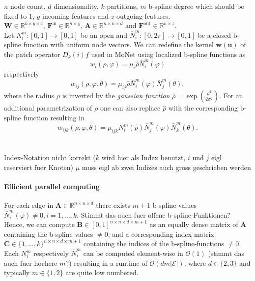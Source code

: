 \documentclass[pdftex,10pt,a4paper]{scrartcl}
\begin{document}
$n$ node count,
$d$ dimensionality,
$k$ partitions,
$m$ b-spline degree which should be fixed to $1$,
$y$ incoming features and
$z$ outgoing features.
\\
$\mathbf{W} \in \mathbb{R}^{k \times y \times z}$,
$\mathbf{F}^{\mathrm{in}} \in \mathbb{R}^{n \times y}$,
$\mathbf{A} \in \mathbb{R}^{n \times n \times d}$ and
$\mathbf{F}^{\mathrm{out}} \in \mathbb{R}^{n \times z}$.
\\
Let $N_i^m \colon [0, 1] \to [0, 1]$ be an open and $\bar{N}_i^m \colon [0, 2\pi] \to [0, 1]$ be a closed b-spline function with uniform node vectors.
We can redefine the kernel $\mathbf{w}(\mathbf{u})$ of the patch operator $D_k(i)f$ used in MoNet using localized b-spline functions as
\begin{equation*}
  w_i(\rho, \varphi) = \mu_i \hat{\rho} \bar{N}_i^m(\varphi)
\end{equation*}
respectively
\begin{equation*}
  w_{ij}(\rho, \varphi, \theta) = \mu_{ij} \hat{\rho} \bar{N}_i^m(\varphi) \bar{N}_j^m(\theta),
\end{equation*}
where the radius $\rho$ is inverted by the \emph{gaussian function} $\hat{\rho} = \exp(\frac{\rho^2}{2\sigma^2})$.
For an additional parametrization of $\rho$ one can also replace $\hat{\rho}$ with the corresponding b-spline function resulting in
\begin{equation*}
  w_{ijk}(\rho, \varphi, \theta) = \mu_{ijk} N_i^m(\hat{\rho}) \bar{N}_j^m(\varphi) \bar{N}_k^m(\theta).
\end{equation*}
\\\\
Index-Notation nicht korrekt ($k$ wird hier als Index benutzt, $i$ und $j$ eigl reserviert fuer Knoten)
$\mu$ muss eigl ab zwei Indizes auch gross geschrieben werden

\paragraph{Efficient parallel computing}

For each edge in $\mathbf{A} \in \mathbb{R}^{n \times n \times d}$ there exists $m + 1$ b-spline values $\bar{N}_i^m(\varphi) \neq 0, i = 1, \ldots, k$.
Stimmt das auch fuer offene b-spline-Funktionen?
Hence, we can compute $\mathbf{B} \in {[0, 1]}^{n \times n \times d \times m + 1}$ as an equally dense matrix of $\mathbf{A}$ containing the b-spline values $\neq 0$, and a corresponding index matrix $\mathbf{C} \in {\{ 1, \ldots, k \}}^{n \times n \times d \times m + 1}$ containing the indices of the b-spline-functions $\neq 0$.
Each $N_i^m$ respectively $\bar{N}_i^m$ can be computed element-wise in $\mathcal{O}(1)$ (stimmt das auch fuer hoehere $m$?) resulting in a runtime of $\mathcal{O}(dm|\mathcal{E}|)$, where $d \in \{2,3\}$ and typically $m \in \{1, 2\}$ are quite low numbered.
\end{document}
